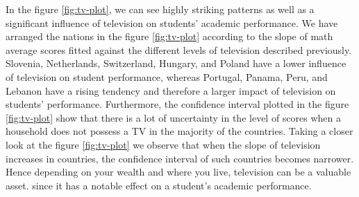 
In the figure \ref{fig:tv-plot}, we can see highly striking patterns as
well as a significant influence of television on students' academic
performance. We have arranged the nations in the figure
\ref{fig:tv-plot} according to the slope of math average scores fitted
against the different levels of television described previously.
Slovenia, Netherlands, Switzerland, Hungary, and Poland have a lower
influence of television on student performance, whereas Portugal,
Panama, Peru, and Lebanon have a rising tendency and therefore a larger
impact of television on students' performance. Furthermore, the
confidence interval plotted in the figure \ref{fig:tv-plot} show that
there is a lot of uncertainty in the level of scores when a household
does not possess a TV in the majority of the countries. Taking a closer
look at the figure \ref{fig:tv-plot} we observe that when the slope of
television increases in countries, the confidence interval of such
countries becomes narrower. Hence depending on your wealth and where you
live, television can be a valuable asset. since it has a notable effect
on a student's academic performance.

